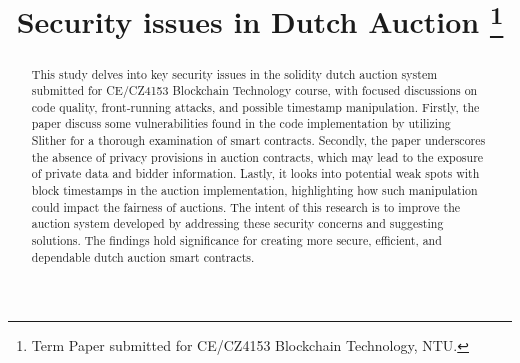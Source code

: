 \documentclass[conference]{IEEEtran}
\begin{document}
\title{{Security issues in Dutch Auction}
\thanks{Term Paper submitted for CE/CZ4153 Blockchain Technology, NTU.}
}

\author{
\and
{}
\and
{}
}

\maketitle

\begin{abstract}
This study delves into key security issues in the solidity dutch auction system submitted for CE/CZ4153 Blockchain Technology course, with focused discussions on code quality, front-running attacks, and possible timestamp manipulation. Firstly, the paper discuss some vulnerabilities found in the code implementation by  utilizing Slither for a thorough examination of smart contracts. Secondly, the paper underscores the absence of privacy provisions in auction contracts, which may lead to the exposure of private data and bidder information. Lastly, it looks into potential weak spots with block timestamps in the auction implementation, highlighting how such manipulation could impact the fairness of auctions. The intent of this research is to improve the auction system developed by addressing these security concerns and suggesting solutions. The findings hold significance for creating more secure, efficient, and dependable dutch auction smart contracts.

\end{abstract}
\end{document}
